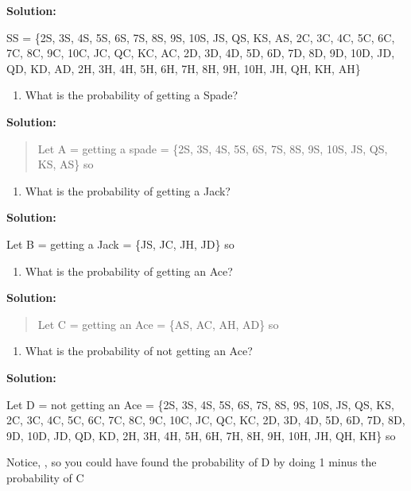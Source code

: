 \documentclass[]{book}
\providecommand{\tightlist}{%
  \setlength{\itemsep}{0pt}\setlength{\parskip}{0pt}}
\begin{document}
\textbf{Solution:}

SS = \{2S, 3S, 4S, 5S, 6S, 7S, 8S, 9S, 10S, JS, QS, KS, AS, 2C, 3C,
4C, 5C, 6C, 7C, 8C, 9C, 10C, JC, QC, KC, AC, 2D, 3D, 4D, 5D, 6D, 7D,
8D, 9D, 10D, JD, QD, KD, AD, 2H, 3H, 4H, 5H, 6H, 7H, 8H, 9H, 10H,
JH, QH, KH, AH\}

\begin{enumerate}
\def\labelenumi{\alph{enumi}.}
\setcounter{enumi}{1}
\tightlist
\item
  What is the probability of getting a Spade?
\end{enumerate}

\textbf{Solution:}

\begin{quote}
Let A = getting a spade = \{2S, 3S, 4S, 5S, 6S, 7S, 8S, 9S, 10S, JS,
QS, KS, AS\} so
\end{quote}

\begin{enumerate}
\def\labelenumi{\alph{enumi}.}
\setcounter{enumi}{2}
\tightlist
\item
  What is the probability of getting a Jack?
\end{enumerate}

\textbf{Solution:}

Let B = getting a Jack = \{JS, JC, JH, JD\} so

\begin{enumerate}
\def\labelenumi{\alph{enumi}.}
\setcounter{enumi}{3}
\tightlist
\item
  What is the probability of getting an Ace?
\end{enumerate}

\textbf{Solution:}

\begin{quote}
Let C = getting an Ace = \{AS, AC, AH, AD\} so
\end{quote}

\begin{enumerate}
\def\labelenumi{\alph{enumi}.}
\setcounter{enumi}{4}
\tightlist
\item
  What is the probability of not getting an Ace?
\end{enumerate}

\textbf{Solution:}

Let D = not getting an Ace = \{2S, 3S, 4S, 5S, 6S, 7S, 8S, 9S, 10S,
JS, QS, KS, 2C, 3C, 4C, 5C, 6C, 7C, 8C, 9C, 10C, JC, QC, KC, 2D, 3D,
4D, 5D, 6D, 7D, 8D, 9D, 10D, JD, QD, KD, 2H, 3H, 4H, 5H, 6H, 7H, 8H,
9H, 10H, JH, QH, KH\} so

Notice, , so you could have found the probability of D by doing 1
minus the probability of C
\end{document}
